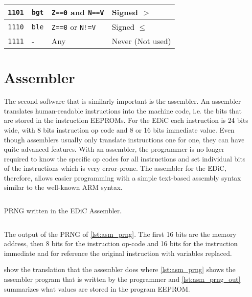 \begin{table}[t]
\begin{tabularx}{\textwidth}{ |c|l|l|X| }
    \texttt{1101}           & \texttt{bgt}                         & \texttt{Z==0} and \texttt{N==V} & Signed $>$       \\\hline
    \texttt{1110}           & \texttt{ble}                         & \texttt{Z==0} or \texttt{N!=V}  & Signed $\leq$    \\\hline
    \texttt{1111}           & -                                    & Any                             & Never (Not used) \\\hline
  \end{tabularx}
\end{table}

\section{Assembler}
The second software that is similarly important is the assembler.
An assembler translates human-readable instructions into the machine code, i.e. the bits that are stored in the instruction \glspl{EEPROM}.
For the \gls{EDiC} each instruction is 24 bits wide, with 8 bits instruction op code and 8 or 16 bits immediate value.
Even though assemblers usually only translate instructions one for one, they can have quite advanced features.
With an assembler, the programmer is no longer required to know the specific op codes for all instructions and set individual bits of the instructions which is very error-prone.
The assembler for the \gls{EDiC}, therefore, allows easier programming with a simple text-based assembly syntax similar to the well-known ARM syntax.
\begin{listing}[t]
  \inputminted[linenos,
    breaklines,
    frame=leftline,
    xleftmargin=20pt,
  ]{ARM}{src/prng.s}
  \caption{\gls{PRNG} written in the \gls{EDiC} Assembler.}
  \label{lst:asm_prng}
\end{listing}

\begin{listing}[t]
  \inputminted[linenos,
    breaklines,
    frame=leftline,
    xleftmargin=20pt,
  ]{ARM}{src/prng_out.s}
  \caption{The output of the \gls{PRNG} of \cref{lst:asm_prng}. The first 16 bits are the memory address, then 8 bits for the instruction op-code and 16 bits for the instruction immediate and for reference the original instruction with variables replaced.}
  \label{lst:asm_prng_out}
\end{listing}

 show the translation that the assembler does where \cref{lst:asm_prng} shows the assembler program that is written by the programmer and \cref{lst:asm_prng_out} summarizes what values are stored in the program \gls{EEPROM}.

